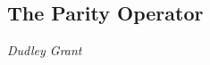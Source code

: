 






\subsection{The Parity Operator}
\vspace{-1.0em}
\begin{center}
\tiny{\textit{Dudley Grant}}
\end{center}


